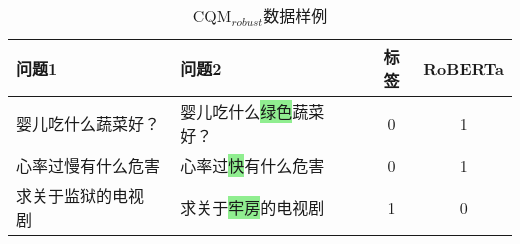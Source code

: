 \begin{table}
    \caption{CQM$_{robust}$数据样例}
    \centering
    \newcommand{\tabincell}[2]{\begin{tabular}{@{}#1@{}}#2\end{tabular}}
    \begin{tabular}{llcc}
    \toprule[0.7pt]
     \textbf{问题1} & \textbf{问题2} & \textbf{标签} & \textbf{RoBERTa} \\
    \midrule[0.7pt]
    婴儿吃什么蔬菜好？ & 婴儿吃什么\colorbox{lightgreen}{\color{darkgreen}绿色}蔬菜好？\;\  & 0 & 1 \\\hline
    心率过\colorbox{lightred}{\color{darkred}慢}有什么危害 & 心率过\colorbox{lightgreen}{\color{darkgreen}快}有什么危害 & 0 & 1 \\\hline
    求关于\colorbox{lightred}{\color{darkred}监狱}的电视剧\quad\ & 求关于\colorbox{lightgreen}{\color{darkgreen}牢房}的电视剧 & 1 & 0 \\
    
        
    \bottomrule[0.7pt]
    
    \end{tabular}
    \label{table5-1}
\end{table}
